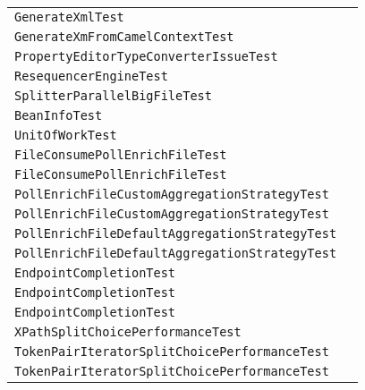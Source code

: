 \begin{center}
\begin{tabular}{ll}
\lstinline/GenerateXmlTest/&\raisebox{0pt}{\lstinline/dump(RouteContainercontext)/}\\
\lstinline/GenerateXmFromCamelContextTest/&\raisebox{0pt}{\lstinline/dump(Objectobject)/}\\
\lstinline/PropertyEditorTypeConverterIssueTest/&\raisebox{0pt}{\lstinline/testPropertyEditorTypeConverter()/}\\
\lstinline/ResequencerEngineTest/&\raisebox{0pt}{\lstinline/testReverse(intcapacity)/}\\
\lstinline/SplitterParallelBigFileTest/&\raisebox{0pt}{\lstinline/xxxtestSplitParallelBigFile()/}\\
\lstinline/BeanInfoTest/&\raisebox{0pt}{\lstinline/assertMethodPattern(BeanInfo)/}\\
\lstinline/UnitOfWorkTest/&\raisebox{0pt}{\lstinline/process(Exchange)/}\\
\lstinline/FileConsumePollEnrichFileTest/&\raisebox{0pt}{\lstinline/testPollEnrich()/}\\
\lstinline/FileConsumePollEnrichFileTest/&\raisebox{0pt}{\lstinline/testPollEnrich()/}\\
\lstinline/PollEnrichFileCustomAggregationStrategyTest/&\raisebox{0pt}{\lstinline/PollEnrichCustomAggregationStrategyBody()/}\\
\lstinline/PollEnrichFileCustomAggregationStrategyTest/&\raisebox{0pt}{\lstinline/PollEnrichCustomAggregationStrategyBody()/}\\
\lstinline/PollEnrichFileDefaultAggregationStrategyTest/&\raisebox{0pt}{\lstinline/PollEnrichDefaultAggregationStrategyBody()/}\\
\lstinline/PollEnrichFileDefaultAggregationStrategyTest/&\raisebox{0pt}{\lstinline/PollEnrichDefaultAggregationStrategyBody()/}\\
\lstinline/EndpointCompletionTest/&\raisebox{0pt}{\lstinline/assertParameterJsonSchema(MBeanServer)/}\\
\lstinline/EndpointCompletionTest/&\raisebox{0pt}{\lstinline/assertParameterJsonSchema(MBeanServer)/}\\
\lstinline/EndpointCompletionTest/&\raisebox{0pt}{\lstinline/assertCompletion(MBeanServermbean)/}\\
\lstinline/XPathSplitChoicePerformanceTest/&\raisebox{0pt}{\lstinline/xxTestXPatPerformanceRoute()/}\\
\lstinline/TokenPairIteratorSplitChoicePerformanceTest/&\raisebox{0pt}{\lstinline/xxxtestTokenPairPerformanceRoute()/}\\
\lstinline/TokenPairIteratorSplitChoicePerformanceTest/&\raisebox{0pt}{\lstinline/xxxtestTokenPairPerformanceRoute()/}\\

\end{tabular}
\end{center}
